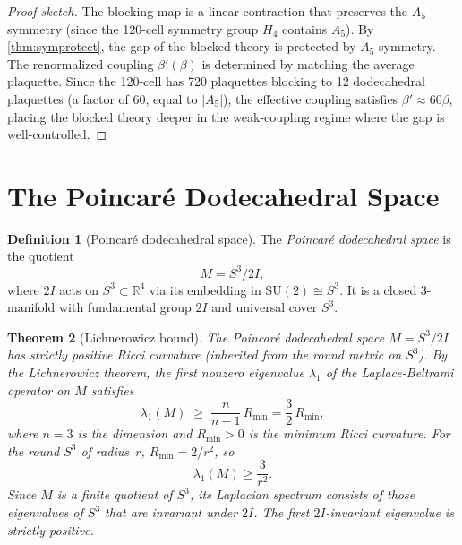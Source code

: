 \documentclass[12pt,a4paper]{article}
\newtheorem{theorem}{Theorem}[section]
\theoremstyle{definition}
\newtheorem{definition}[theorem]{Definition}
\theoremstyle{remark}
\newcommand{\R}{\mathbb{R}}
\newcommand{\SU}{\mathrm{SU}}
\begin{document}
\begin{proof}[Proof sketch]
The blocking map is a linear contraction that preserves the $A_5$
symmetry (since the 120-cell symmetry group $H_4$ contains $A_5$).
By \cref{thm:symprotect}, the gap of the blocked theory is protected
by $A_5$ symmetry.  The renormalized coupling $\beta'(\beta)$ is
determined by matching the average plaquette.  Since the 120-cell
has 720 plaquettes blocking to 12 dodecahedral plaquettes (a factor
of 60, equal to $|A_5|$), the effective coupling satisfies
$\beta' \approx 60\beta$, placing the blocked theory deeper in the
weak-coupling regime where the gap is well-controlled.
\end{proof}

\section{The Poincar\'{e} Dodecahedral Space}\label{sec:poincare}

\begin{definition}[Poincar\'{e} dodecahedral space]\label{def:poincare}
The \emph{Poincar\'{e} dodecahedral space} is the quotient
\[
  M = S^3 / 2I,
\]
where $2I$ acts on $S^3 \subset \R^4$ via its embedding in $\SU(2)
\cong S^3$.  It is a closed 3-manifold with fundamental group $2I$
and universal cover $S^3$.
\end{definition}

\begin{theorem}[Lichnerowicz bound]\label{thm:lichnerowicz}
The Poincar\'{e} dodecahedral space $M = S^3/2I$ has strictly positive
Ricci curvature (inherited from the round metric on $S^3$).
By the Lichnerowicz theorem, the first nonzero eigenvalue $\lambda_1$
of the Laplace-Beltrami operator on $M$ satisfies
\begin{equation}\label{eq:lichnerowicz}
  \lambda_1(M) \;\ge\; \frac{n}{n-1}\, R_{\min} = \frac{3}{2}\,R_{\min},
\end{equation}
where $n = 3$ is the dimension and $R_{\min} > 0$ is the minimum Ricci
curvature.  For the round $S^3$ of radius~$r$, $R_{\min} = 2/r^2$, so
\begin{equation}\label{eq:lambda1_M}
  \lambda_1(M) \ge \frac{3}{r^2}.
\end{equation}
Since $M$ is a finite quotient of $S^3$, its Laplacian spectrum consists
of those eigenvalues of $S^3$ that are invariant under $2I$.  The first
$2I$-invariant eigenvalue is strictly positive.
\end{theorem}
\end{document}
